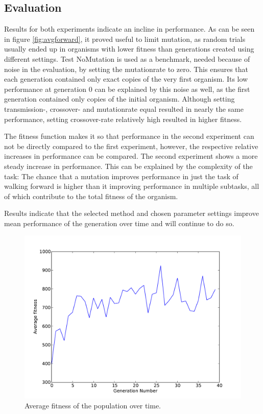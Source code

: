 \documentclass{article}
\begin{document}
\subsection{Evaluation}
Results for both experiments indicate an incline in performance. As can be seen in figure \ref{fig:avgforward}, it proved useful to limit mutation, as random trials usually ended up in organisms with lower fitness than generations created using different settings. Test NoMutation is used as a benchmark, needed because of noise in the evaluation, by setting the mutationrate to zero. This ensures that each generation contained only exact copies of the very first organism. Its low performance at generation 0 can be explained by this noise as well, as the first generation contained only copies of the initial organism. Although setting transmission-, crossover- and mutationrate equal resulted in nearly the same performance, setting crossover-rate relatively high resulted in higher fitness. 

The fitness function makes it so that performance in the second experiment can not be directly compared to the first experiment, however, the respective relative increases in performance can be compared. The second experiment shows a more steady increase in performance. This can be explained by the complexity of the task: The chance that a mutation improves performance in just the task of walking forward is higher than it improving performance in multiple subtasks, all of which contribute to the total fitness of the organism. 

Results indicate that the selected method and chosen parameter settings improve mean performance of the generation over time and will continue to do so. 
\newpage
\begin{figure}[h!]
	\center
	\includegraphics[width=.8\textwidth]{images/fitness}
	\caption{Average fitness of the population over time.}
	\label{fig:avg}
\end{figure}
\end{document}
